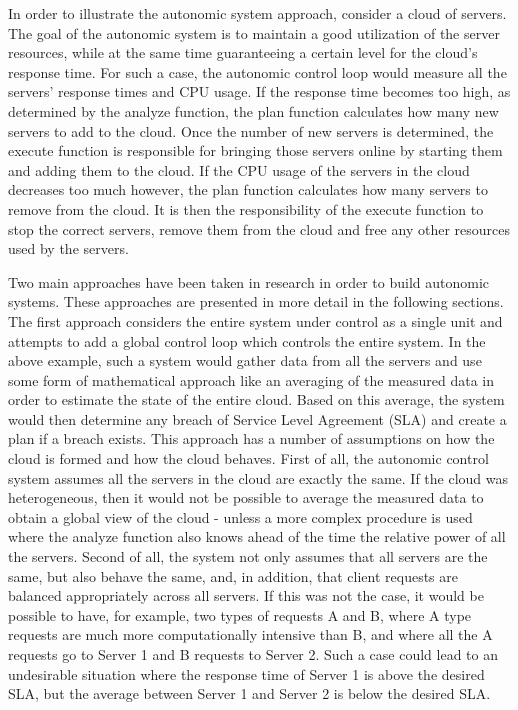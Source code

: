 In order to illustrate the autonomic system approach, consider a cloud of servers. The goal of the autonomic system is to maintain a good utilization of the server resources, while at the same time guaranteeing a certain level for the cloud's response time. For such a case, the autonomic control loop would measure all the servers' response times and CPU usage. If the response time becomes too high, as determined by the analyze function, the plan function calculates how many new servers to add to the cloud. Once the number of new servers is determined, the execute function is responsible for bringing those servers online by starting them and adding them to the cloud. If the CPU usage of the servers in the cloud decreases too much however, the plan function calculates how many servers to remove from the cloud. It is then the responsibility of the execute function to stop the correct servers, remove them from the cloud and free any other resources used by the servers.

Two main approaches have been taken in research in order to build autonomic systems. These approaches are presented in more detail in the following sections. The first approach considers the entire system under control as a single unit and attempts to add a global control loop which controls the entire system. In the above example, such a system would gather data from all the servers and use some form of mathematical approach like an averaging of the measured data in order to estimate the state of the entire cloud. Based on this average, the system would then determine any breach of Service Level Agreement (SLA) and create a plan if a breach exists. This approach has a number of assumptions on how the cloud is formed and how the cloud behaves. First of all, the autonomic control system assumes all the servers in the cloud are exactly the same. If the cloud was heterogeneous, then it would not be possible to average the measured data to obtain a global view of the cloud - unless a more complex procedure is used where the analyze function also knows ahead of the time the relative power of all the servers. Second of all, the system not only assumes that all servers are the same, but also behave the same, and, in addition, that client requests are balanced appropriately across all servers. If this was not the case, it would be possible to have, for example, two types of requests A and B, where A type requests are much more computationally intensive than B, and where all the A requests go to Server 1 and B requests to Server 2. Such a case could lead to an undesirable situation where the response time of Server 1 is above the desired SLA, but the average between Server 1 and Server 2 is below the desired SLA.

